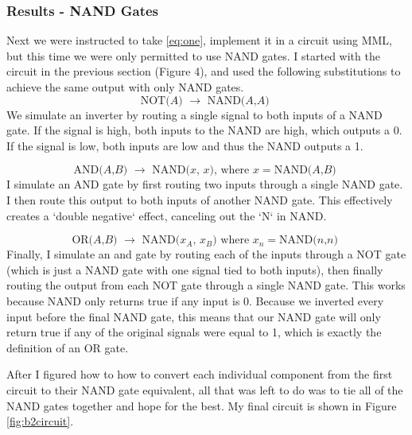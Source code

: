 \documentclass[a4paper,11pt]{article}
\begin{document}
\subsubsection{Results - NAND Gates}
Next we were instructed to take \eqref{eq:one}, implement it in a circuit using MML, but this time we were only permitted to use NAND gates. I started with the circuit in the previous section (Figure 4), and used the following substitutions to achieve the same output with only NAND gates.
\[ \text{NOT($A$) $\to$ NAND($A$,$A$) }\]
We simulate an inverter by routing a single signal to both inputs of a NAND gate. If the signal is high, both inputs to the NAND are high, which outputs a 0. If the signal is low, both inputs are low and thus the NAND outputs a 1.

\[ \text{AND($A$,$B$) $\to$ NAND($x$, $x$), where $x = $NAND($A$,$B$) } \]
I simulate an AND gate by first routing two inputs through a single NAND gate. I then route this output to both inputs of another NAND gate. This effectively creates a `double negative` effect, canceling out the `N` in NAND.

\[ \text{OR($A$,$B$) $\to$ NAND($x_A$, $x_B$) where $x_n = $NAND($n$,$n$) }\]
Finally, I simulate an and gate by routing each of the inputs through a NOT gate (which is just a NAND gate with one signal tied to both inputs), then finally routing the output from each NOT gate through a single NAND gate. This works because NAND only returns true if any input is 0. Because we inverted every input before the final NAND gate, this means that our NAND gate will only return true if any of the original signals were equal to 1, which is exactly the definition of an OR gate.

After I figured how to how to convert each individual component from the first circuit to their NAND gate equivalent, all that was left to do was to tie all of the NAND gates together and hope for the best. My final circuit is shown in Figure \ref{fig:b2circuit}.  
\end{document}
